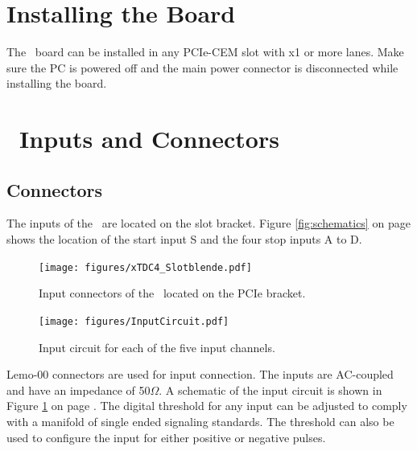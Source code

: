 
\section{Installing the Board}
The \deviceName\ board can be installed in any PCIe-CEM slot with x1 or more lanes. 
Make sure the PC is powered off and the main power connector is disconnected while installing the board.\par

%
\section{\deviceName\ Inputs and Connectors}
	\subsection{Connectors}
	The inputs of the \deviceName\ are located on the slot bracket. Figure \ref{fig:schematics} on page \pageref{fig:schematics} shows the location of the start input S and the four stop inputs A to D.
%
	\begin{figure}[hb]
		\begin{center}
			\texttt{[image: figures/xTDC4\_Slotblende.pdf]}
			\caption{Input connectors of the \deviceName\ located on the PCIe bracket.}
		\end{center}
	\end{figure}
		\begin{figure}[hb]
			\begin{center}
				\texttt{[image: figures/InputCircuit.pdf]}
				\caption{Input circuit for each of the five input channels.\label{fig:inputcirc}}
			\end{center}
		\end{figure}
	Lemo-00 connectors are used for input connection. The inputs are AC-coupled and have an impedance of 50$\Omega$. 
	A schematic of the input circuit is shown in Figure \ref{fig:inputcirc} on page \pageref{fig:inputcirc}. 
	The digital threshold for any input can be adjusted to comply with a manifold of single ended signaling standards.
	The threshold can also be used to configure the input for either positive or negative pulses.
	
